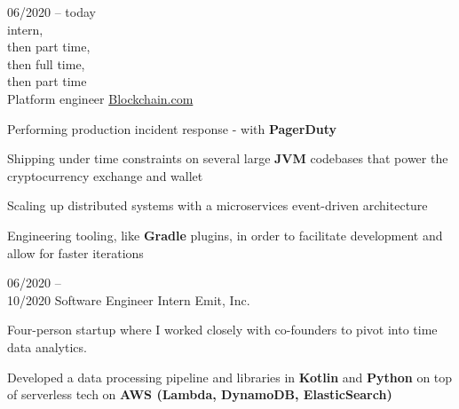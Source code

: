 \documentclass[9pt]{developercv}
\newcommand{\para}{\vspace{0.4em}}
\begin{document}
    \vspace{0.1cm}





    \begin{entrylist}
        \entry
        {
            06/2020 -- today\\\footnotesize{intern,\\then part time, \\then full time, \\then part time}\\
        }
        {Platform engineer}
        {\href{https://blockchain.com/about}{Blockchain.com}}
        {
            Performing production incident response - with \textbf{PagerDuty}

            \para
            Shipping under time constraints on several large \textbf{JVM} codebases that power the
            cryptocurrency exchange and wallet

            \para
            Scaling up distributed systems with a microservices event-driven architecture

            \para
            Engineering tooling, like \textbf{Gradle} plugins, in order to facilitate development
        and allow for faster iterations
        }
        \entry
        {06/2020 -- \\ 10/2020}
        {Software Engineer Intern}
        {Emit, Inc.}
        {
            Four-person startup where I worked closely with co-founders to pivot into time data
            analytics.

            \para
            Developed a data processing pipeline and libraries in \textbf{Kotlin} and
            \textbf{Python} on top of serverless tech on \textbf{AWS (Lambda, DynamoDB,
                ElasticSearch)}
        }
    \end{entrylist}

\end{document}
